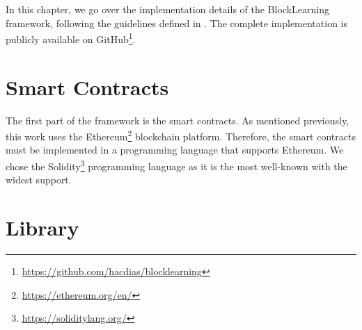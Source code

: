 In this chapter, we go over the implementation details of the BlockLearning framework, following the guidelines defined in . The complete implementation is publicly available on GitHub\footnote{\url{https://github.com/hacdias/blocklearning}}.

\section{Smart Contracts}

The first part of the framework is the smart contracts. As mentioned previously, this work uses the Ethereum\footnote{\url{https://ethereum.org/en/}} blockchain platform. Therefore, the smart contracts must be implemented in a programming language that supports Ethereum. We chose the Solidity\footnote{\url{https://soliditylang.org/}} programming language as it is the most well-known with the widest support.

\todo{}



\section{Library}




